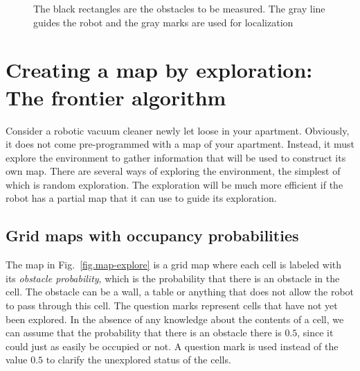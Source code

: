 \begin{figure}
\begin{center}
\end{center}
\caption{The black rectangles are the obstacles to be measured. The gray line guides the robot and the gray marks are used for localization}\label{fig.mapping-activity}
\end{figure}

\section{Creating a map by exploration: The frontier algorithm}\label{s.map-create}

Consider a robotic vacuum cleaner newly let loose in your apartment. Obviously, it does not come pre-programmed with a map of your apartment. Instead, it must explore the environment to gather information that will be used to construct its own map. There are several ways of exploring the environment, the simplest of which is random exploration. The exploration will be much more efficient if the robot has a partial map that it can use to guide its exploration.

\subsection{Grid maps with occupancy probabilities}

The map in Fig.~\ref{fig.map-explore} is a grid map where each cell is labeled with its \emph{obstacle probability}, which is the probability that there is an obstacle in the cell. The obstacle can be a wall, a table or anything that does not allow the robot to pass through this cell. The question marks represent cells that have not yet been explored. In the absence of any knowledge about the contents of a cell, we can assume that the probability that there is an obstacle there is $0.5$, since it could just as easily be occupied or not. A question mark is used instead of the value $0.5$ to clarify the unexplored status of the cells.

